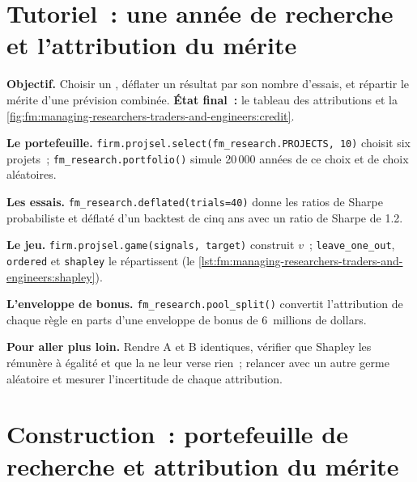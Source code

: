 \section{Tutoriel~: une année de recherche et l'attribution du mérite}\label{tut:fm:managing-researchers-traders-and-engineers:tut}

\begin{tutorial}
\textbf{Objectif.} Choisir un , déflater un résultat par son nombre d'essais, et répartir le mérite d'une prévision combinée. \textbf{État final~:} le
tableau des attributions et la \cref{fig:fm:managing-researchers-traders-and-engineers:credit}.
\begin{tutsteps}
\item \textbf{Le portefeuille.} \texttt{firm.projsel.select(fm\_research.PROJECTS, 10)} choisit six projets~; \texttt{fm\_research.portfolio()}
simule 20\,000 années de ce choix et de choix aléatoires.
\item \textbf{Les essais.} \texttt{fm\_research.deflated(trials=40)} donne les ratios de Sharpe probabiliste et déflaté d'un backtest de cinq ans
avec un ratio de Sharpe de 1.2.
\item \textbf{Le jeu.} \texttt{firm.projsel.game(signals, target)} construit $v$~; \texttt{leave\_one\_out}, \texttt{ordered} et \texttt{shapley}
le répartissent (le \cref{lst:fm:managing-researchers-traders-and-engineers:shapley}).
\item \textbf{L'enveloppe de bonus.} \texttt{fm\_research.pool\_split()} convertit l'attribution de chaque règle en parts d'une enveloppe de bonus de 6~millions de dollars.
\end{tutsteps}
\end{tutorial}

\textbf{Pour aller plus loin.} Rendre A et B identiques, vérifier que Shapley les rémunère à égalité et que la  ne leur verse rien~; relancer avec
un autre germe aléatoire et mesurer l'incertitude de chaque attribution.

\section{Construction~: portefeuille de recherche et attribution du mérite}\label{bld:fm:managing-researchers-traders-and-engineers:projsel}

